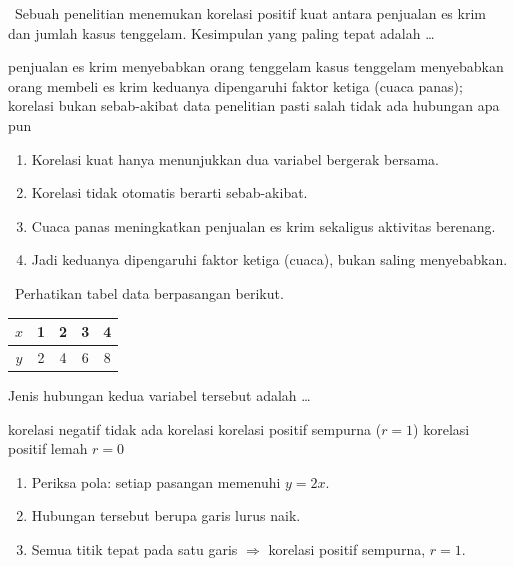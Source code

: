 \documentclass[11pt,a4paper]{exam}
\newenvironment{langkah}{%
  \begin{enumerate}[label=\textbf{Langkah \arabic*:},leftmargin=2.6em,
    itemsep=2pt,topsep=2pt]}{\end{enumerate}}
\newcommand{\Adv}{{\footnotesize\textsf{\textcolor{oranye}{[Advanced]}}}\ }
\begin{document}
\begin{questions}
\question \Adv Sebuah penelitian menemukan korelasi positif kuat antara penjualan
es krim dan jumlah kasus tenggelam. Kesimpulan yang paling tepat adalah \dots
\begin{choices}
\choice penjualan es krim menyebabkan orang tenggelam
\choice kasus tenggelam menyebabkan orang membeli es krim
\CorrectChoice keduanya dipengaruhi faktor ketiga (cuaca panas); korelasi bukan sebab-akibat
\choice data penelitian pasti salah
\choice tidak ada hubungan apa pun
\end{choices}
\begin{solution}
\begin{langkah}
\item Korelasi kuat hanya menunjukkan dua variabel bergerak bersama.
\item Korelasi tidak otomatis berarti sebab-akibat.
\item Cuaca panas meningkatkan penjualan es krim sekaligus aktivitas berenang.
\item Jadi keduanya dipengaruhi faktor ketiga (cuaca), bukan saling menyebabkan.
\end{langkah}
\end{solution}

\question \Adv Perhatikan tabel data berpasangan berikut.

\begin{center}\small
\begin{tabular}{|c|c|c|c|c|}
\hline
$x$ & 1 & 2 & 3 & 4\\\hline
$y$ & 2 & 4 & 6 & 8\\\hline
\end{tabular}
\end{center}

Jenis hubungan kedua variabel tersebut adalah \dots
\begin{choices}
\choice korelasi negatif
\choice tidak ada korelasi
\CorrectChoice korelasi positif sempurna ($r=1$)
\choice korelasi positif lemah
\choice $r=0$
\end{choices}
\begin{solution}
\begin{langkah}
\item Periksa pola: setiap pasangan memenuhi $y = 2x$.
\item Hubungan tersebut berupa garis lurus naik.
\item Semua titik tepat pada satu garis $\Rightarrow$ korelasi positif sempurna, $r = 1$.
\end{langkah}
\end{solution}


\end{questions}
\end{document}
